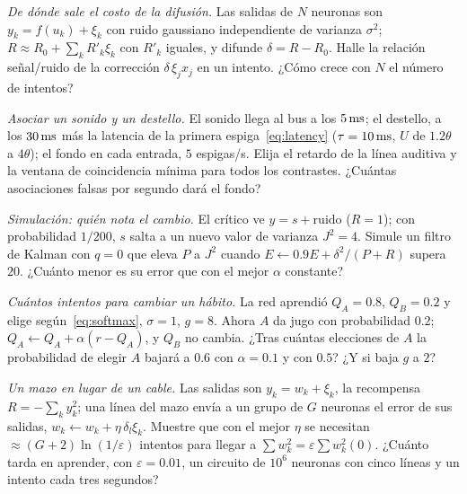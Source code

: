 \begin{exercise}[\lvlB]
\label{ex:10:3}
\emph{De dónde sale el costo de la difusión.} Las salidas de $N$ neuronas son $y_k=f(u_k)+\xi_k$ con ruido gaussiano independiente de varianza $\sigma^2$; $R\approx R_0+\sum_kR'_k\xi_k$ con $R'_k$ iguales, y  difunde $\delta=R-R_0$. Halle la relación señal/ruido de la corrección $\delta\,\xi_jx_j$ en un intento. ¿Cómo crece con $N$ el número de intentos?
\end{exercise}

\begin{exercise}[\lvlB]
\label{ex:10:4}
\emph{Asociar un sonido y un destello.} El sonido llega al bus a los $5\,\text{ms}$; el destello, a los $30\,\text{ms}$ más la latencia de la primera espiga~\eqref{eq:latency} ($\tau=10\,\text{ms}$, $U$ de $1.2\theta$ a $4\theta$); el fondo en cada entrada, $5$ espigas/s. Elija el retardo de la línea auditiva y la ventana de coincidencia mínima para todos los contrastes. ¿Cuántas asociaciones falsas por segundo dará el fondo?
\end{exercise}

\begin{exercise}[\lvlB]
\label{ex:10:5}
\emph{Simulación: quién nota el cambio.} El crítico ve $y=s+\text{ruido}$ ($R=1$); con probabilidad $1/200$, $s$ salta a un nuevo valor de varianza $J^2=4$. Simule un filtro de Kalman con $q=0$ que eleva $P$ a $J^2$ cuando $E\leftarrow0.9E+\delta^2/(P+R)$ supera $20$. ¿Cuánto menor es su error que con el mejor $\alpha$ constante?
\end{exercise}

\begin{exercise}[\lvlA]
\label{ex:10:6}
\emph{Cuántos intentos para cambiar un hábito.} La red aprendió $Q_A=0.8$, $Q_B=0.2$ y elige según~\eqref{eq:softmax}, $\sigma=1$, $g=8$. Ahora $A$ da jugo con probabilidad $0.2$; $Q_A\leftarrow Q_A+\alpha(r-Q_A)$, y $Q_B$ no cambia. ¿Tras cuántas elecciones de $A$ la probabilidad de elegir $A$ bajará a $0.6$ con $\alpha=0.1$ y con $0.5$? ¿Y si  baja $g$ a $2$?
\end{exercise}

\begin{exercise}[\lvlC]
\label{ex:10:7}
\emph{Un mazo en lugar de un cable.} Las salidas son $y_k=w_k+\xi_k$, la recompensa $R=-\sum_ky_k^2$; una línea del mazo envía a un grupo de $G$ neuronas el error de sus salidas, $w_k\leftarrow w_k+\eta\,\delta_l\xi_k$. Muestre que con el mejor $\eta$ se necesitan $\approx(G+2)\ln(1/\varepsilon)$ intentos para llegar a $\sum w_k^2=\varepsilon\sum w_k^2(0)$. ¿Cuánto tarda en aprender, con $\varepsilon=0.01$, un circuito de $10^6$ neuronas con cinco líneas y un intento cada tres segundos?
\end{exercise}
